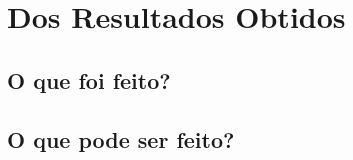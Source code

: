 \chapter{Dos Resultados Obtidos}
\label{cap:results}

\section{O que foi feito?}
\label{sec:to-be-done}

\section{O que pode ser feito?}
\label{sec:what-can-be-done}
